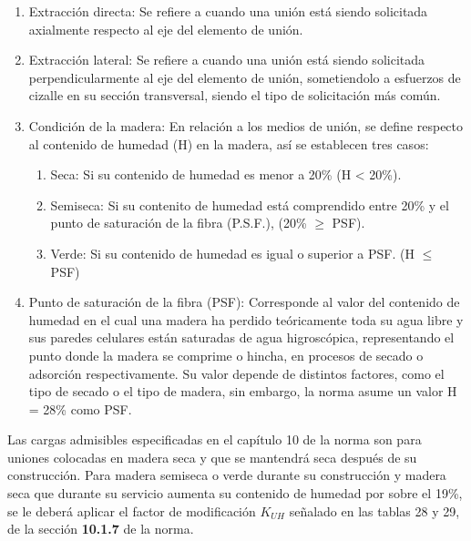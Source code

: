 \begin{enumerate}
		\item Extracción directa: Se refiere a cuando una unión está siendo solicitada axialmente respecto al eje del elemento de unión. 
		\item Extracción lateral: Se refiere a cuando una unión está siendo solicitada perpendicularmente al eje del elemento de unión, sometiendolo a esfuerzos de cizalle en su sección transversal, siendo el tipo de solicitación más común.
		\item Condición de la madera: En relación a los medios de unión, se define respecto al contenido de humedad (H) en la madera, así se establecen tres casos:
		\begin{enumerate}
			\item Seca: Si su contenido de humedad es menor a 20\% (H < 20\%).
			\item Semiseca: Si su contenito de humedad está comprendido entre 20\% y el punto de saturación de la fibra (P.S.F.), (20\% $\geq$  PSF).
			\item Verde: Si su contenido de humedad es igual o superior a PSF. (H $\leq$ PSF)
		\end{enumerate}
		\item Punto de saturación de la fibra (PSF): Corresponde al valor del contenido de humedad en el cual una madera ha perdido teóricamente toda su agua libre y sus paredes celulares están saturadas de agua higroscópica, representando el punto donde la madera se comprime o hincha, en procesos de secado o adsorción respectivamente. Su valor depende de distintos factores, como el tipo de secado o el tipo de madera, sin embargo, la norma asume un valor H = 28\% como PSF.
\end{enumerate}

Las cargas admisibles especificadas en el capítulo 10 de la norma son para uniones colocadas en madera seca y que se mantendrá seca después de su construcción. Para madera semiseca o verde durante su construcción y madera seca que durante su servicio aumenta su contenido de humedad por sobre el 19\%, se le deberá aplicar el factor de modificación $K_{UH}$ señalado en las tablas 28 y 29, de la sección \textbf{10.1.7} de la norma.

